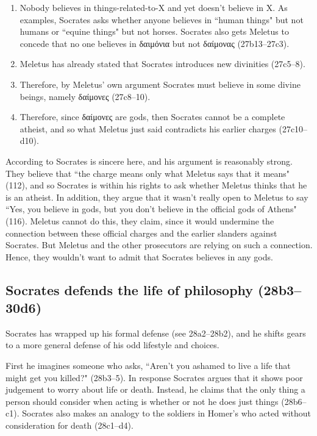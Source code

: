 \documentclass[11pt]{article}
\begin{document}
\begin{enumerate}
    \item Nobody believes in things-related-to-X and yet doesn't believe in X.  As examples, Socrates asks whether anyone believes in ``human things" but not humans or ``equine things" but not horses.  Socrates also gets Meletus to concede that no one believes in δαιμόνια but not δαίμονας (27b13--27c3).
    \item Meletus has already stated that Socrates introduces new divinities (27c5--8).
    \item Therefore, by Meletus' own argument Socrates must believe in some divine beings, namely δαίμονες (27c8--10).
    \item Therefore, since δαίμονες are gods, then Socrates cannot be a complete atheist, and so what Meletus just said contradicts his earlier charges (27c10--d10).
\end{enumerate}

According to \citeauthor{brickhouse2004} Socrates is sincere here, and his argument is reasonably strong.  They believe that ``the charge means only what Meletus says that it means" (112), and so Socrates is within his rights to ask whether Meletus thinks that he is an atheist.  In addition, they argue that it wasn't really open to Meletus to say ``Yes, you believe in gods, but you don't believe in the official gods of Athens" (116).  Meletus cannot do this, they claim, since it would undermine the connection between these official charges and the earlier slanders against Socrates.  But Meletus and the other prosecutors are relying on such a connection.  Hence, they wouldn't want to admit that Socrates believes in any gods.


\subsection{Socrates defends the life of philosophy (28b3--30d6)}

Socrates has wrapped up his formal defense (see 28a2--28b2), and he shifts gears to a more general defense of his odd lifestyle and choices.

First he imagines someone who asks, ``Aren't you ashamed to live a life that might get you killed?" (28b3--5).  In response Socrates argues that it shows poor judgement to worry about life or death. Instead, he claims that the only thing a person should consider when acting is whether or not he does just things (28b6--c1).  Socrates also makes an analogy to the soldiers in Homer's  who acted without consideration for death (28c1--d4).
\end{document}
